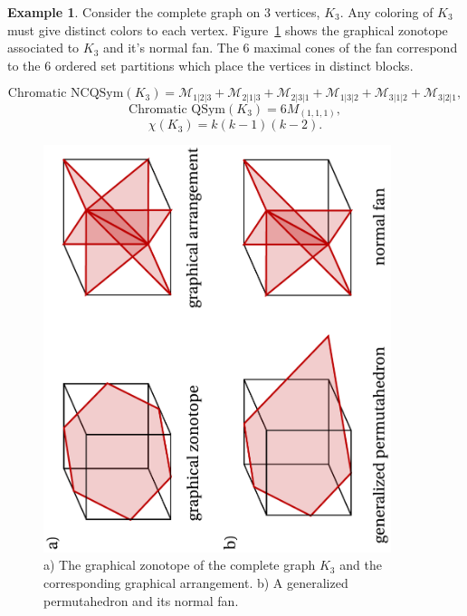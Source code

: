 \documentclass[12pt,reqno]{amsart}
\numberwithin{definition}{section}
\theoremstyle{definition}
\newtheorem{example}[definition]{Example}
\newcommand{\ncM}{\mathcal{M}}
\begin{document}
\begin{example}
Consider the complete graph on $3$ vertices, $K_3$.  Any coloring of
$K_3$ must give distinct colors to each vertex.  Figure~\ref{fig:normalfan} shows
the graphical zonotope associated to $K_3$ and it's normal fan.  The
$6$ maximal cones of the fan correspond to the $6$ ordered set
partitions which place the vertices in distinct blocks.

$$\textrm{Chromatic NCQSym}(K_3) = \ncM_{1|2|3} +\ncM_{2|1|3} +\ncM_{2|3|1} +\ncM_{1|3|2} +\ncM_{3|1|2} +\ncM_{3|2|1},$$ 
$$\textrm{Chromatic QSym}(K_3) = 6M_{(1,1,1)},$$
$$\chi(K_3) = k(k-1)(k-2).$$

\end{example}



\begin{figure}[h]
\includegraphics[angle=270,width=4in]{zonotope_and_generalized_permutahedron}
\caption{a) The graphical zonotope of the complete graph $K_3$ and the corresponding graphical arrangement. b) A generalized permutahedron and its normal fan.}
\label{fig:normalfan}
\end{figure}
\end{document}
